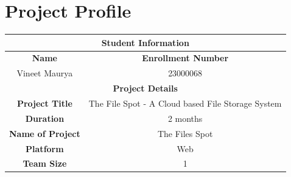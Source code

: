 \documentclass[12pt,a4paper]{report}
\begin{document}
\chapter*{Project Profile}
\begin{center}
	\begin{tabular}{|c|c|}
		\hline
		\multicolumn{2}{|c|}{\cellcolor{black} \color{white} \textbf{Student Information}} \\
		\hline
		\textbf{Name}            & \textbf{Enrollment Number}                              \\
		Vineet Maurya            & 23000068                                                \\
		\hline
		\multicolumn{2}{|c|}{\cellcolor{black} \color{white} \textbf{Project Details}}     \\
		\hline
		\textbf{Project Title}   & The File Spot - A Cloud based File Storage System       \\
		\hline
		\textbf{Duration}        & 2 months                                                \\
		\hline
		\textbf{Name of Project} & The Files Spot                                          \\
		\hline
		\textbf{Platform}        & Web                                                     \\
		\hline
		\textbf{Team Size}       & 1                                                       \\
		\hline
	\end{tabular}
\end{center}
\newpage
{}
\newpage
\end{document}
